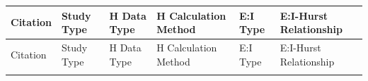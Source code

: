 \documentclass[
true
]{sn-jnl}
\begin{document}
\begin{longtable}[]{@{}
  >{\raggedright\arraybackslash}p{}
  >{\raggedright\arraybackslash}p{}
  >{\raggedright\arraybackslash}p{}
  >{\raggedright\arraybackslash}p{}
  >{\raggedright\arraybackslash}p{}
  >{\raggedright\arraybackslash}p{}@{}}
\toprule\noalign{}
\begin{minipage}[b]{\linewidth}\raggedright
Citation
\end{minipage} & \begin{minipage}[b]{\linewidth}\raggedright
Study Type
\end{minipage} & \begin{minipage}[b]{\linewidth}\raggedright
H Data Type
\end{minipage} & \begin{minipage}[b]{\linewidth}\raggedright
H Calculation Method
\end{minipage} & \begin{minipage}[b]{\linewidth}\raggedright
E:I Type
\end{minipage} & \begin{minipage}[b]{\linewidth}\raggedright
E:I-Hurst Relationship
\end{minipage} \\
\midrule\noalign{}
\endfirsthead
\toprule\noalign{}
\begin{minipage}[b]{\linewidth}\raggedright
Citation
\end{minipage} & \begin{minipage}[b]{\linewidth}\raggedright
Study Type
\end{minipage} & \begin{minipage}[b]{\linewidth}\raggedright
H Data Type
\end{minipage} & \begin{minipage}[b]{\linewidth}\raggedright
H Calculation Method
\end{minipage} & \begin{minipage}[b]{\linewidth}\raggedright
E:I Type
\end{minipage} & \begin{minipage}[b]{\linewidth}\raggedright
E:I-Hurst Relationship
\end{minipage} \\
\midrule\noalign{}
\endhead
\bottomrule\noalign{}

\end{longtable}
\end{document}
